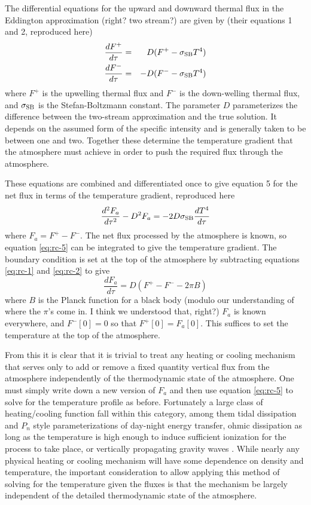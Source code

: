 \documentclass{emulateapj}
\newcommand{\sigmasb}{\sigma_{\rm SB}}
\begin{document}
The differential equations for the upward and downward thermal flux in
the Eddington approximation (right? two stream?) are given by
 (their equations 1 and 2,
reproduced here)
\begin{eqnarray}
  \frac{dF^+}{d\tau} &=& D (F^+ - \sigmasb T^4) 
  \label{eq:rc-1} \\
  \frac{dF^-}{d\tau} &=& - D (F^- - \sigmasb T^4)
    \label{eq:rc-2} 
\end{eqnarray}
where $F^+$ is the upwelling thermal flux and $F^-$ is the
down-welling thermal flux, and $\sigmasb$ is the Stefan-Boltzmann
constant.  The parameter $D$ parameterizes the difference between the
two-stream approximation and the true solution.  It depends on the
assumed form of the specific intensity and is generally taken to be
between one and two.  Together these determine the temperature
gradient that the atmosphere must achieve in order to push the
required flux through the atmosphere.

These equations are combined and differentiated once to give
 equation 5 for the net flux in terms
of the temperature gradient, reproduced here
\begin{equation}
  \frac{d^2 F_a}{d \tau^2} - D^2 F_a 
  = - 2 D \sigmasb \frac{d T^4}{d\tau} 
  \label{eq:rc-5} 
\end{equation}
where $F_a = F^+ - F^-$.  The net flux processed by the atmosphere is
known, so equation \ref{eq:rc-5} can be integrated to give the
temperature gradient.  The boundary condition is set at the top of the
atmosphere by subtracting equations \ref{eq:rc-1} and \ref{eq:rc-2} to
give
\begin{equation}
  \frac{dF_a}{d\tau} = D(F^+ - F^- - 2 \pi B)
\end{equation}
where $B$ is the Planck function for a black body (modulo our
understanding of where the $\pi$'s come in.  I think we understood
that, right?)
$F_a$ is known everywhere, and $F^-[0]=0$ so that $F^+[0] =
F_a[0]$.  This suffices to set the temperature at the top of the
atmosphere.

From this it is clear that it is trivial to treat any heating or
cooling mechanism that serves only to add or remove a fixed quantity
vertical flux from the atmosphere independently of the thermodynamic
state of the atmosphere.  One must simply write down a new version of
$F_a$ and then use equation \ref{eq:rc-5} to solve for the temperature profile as
before.  Fortunately a large class of heating/cooling function fall
within this category, among them tidal dissipation and $P_n$ style
parameterizations of day-night energy transfer, ohmic dissipation as
long as the temperature is high enough to induce sufficient ionization
for the process to take place, or vertically propagating gravity waves
\citep{showman+guillot2002}.  While nearly any physical heating or
cooling mechanism will have some dependence on density and
temperature, the important consideration to allow applying this method
of solving for the temperature given the fluxes is that the mechanism
be largely independent of the detailed thermodynamic state of the
atmosphere.  
\end{document}
